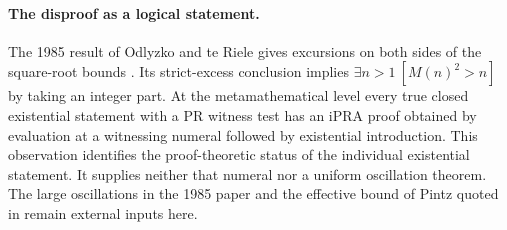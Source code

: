 \paragraph{The disproof as a logical statement.}
The 1985 result of Odlyzko and te Riele gives excursions on both sides of the square-root bounds \cite{ot}. Its strict-excess conclusion implies $\exists n>1\ [M(n)^2>n]$ by taking an integer part. At the metamathematical level every true closed existential statement with a PR witness test has an iPRA proof obtained by evaluation at a witnessing numeral followed by existential introduction. This observation identifies the proof-theoretic status of the individual existential statement. It supplies neither that numeral nor a uniform oscillation theorem. The large oscillations in the 1985 paper and the effective bound of Pintz quoted in \cite{ht} remain external inputs here.
